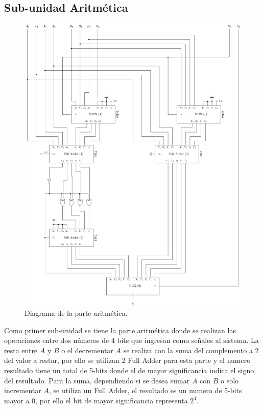 \documentclass[journal, table]{IEEEtran}
\begin{document}
\subsection{Sub-unidad Aritmética}
\begin{figure}[h]
    \centering
    \includegraphics[width=\linewidth]{./Images/arithmetische.pdf}
    \caption{Diagrama de la parte aritmética.}
    \label{fig:arithmetic-diagram}
\end{figure}

Como primer sub-unidad se tiene la parte aritmética donde se realizan las operaciones entre dos números de 4 bits que ingresan como señales al sistema. La resta entre $A$ y $B$ o el decrementar $A$ se realiza con la suma del complemento a 2 del valor a restar, por ello se utilizan 2 Full Adder para esta parte y el numero resultado tiene un total de 5-bits donde el de mayor significancia indica el signo del resultado. Para la suma, dependiendo si se desea sumar $A$ con $B$ o solo incrementar $A$, se utiliza un Full Adder, el resultado es un numero de 5-bits mayor a 0, por ello el bit de mayor significancia representa $2^4$.
\end{document}
